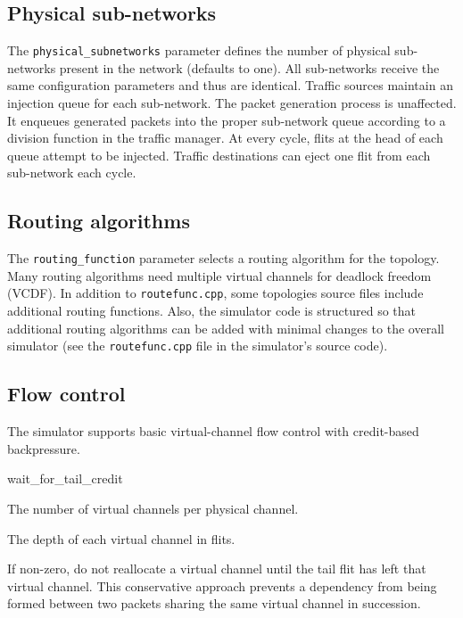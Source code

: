 \documentclass[11pt]{article}
\begin{document}
\subsection{Physical sub-networks}
\label{sec:physical_subnets}

The \texttt{physical\_subnetworks} parameter defines the number of physical sub-networks present in the network (defaults to one).
All sub-networks receive the same configuration parameters and thus are identical. Traffic sources
maintain an injection queue for each sub-network. The packet generation process is unaffected. It enqueues generated packets into the
proper sub-network queue according to a division function in the traffic manager. At every cycle, flits at the head of each queue attempt to be injected.
Traffic destinations can eject one flit from each sub-network each cycle.


\subsection{Routing algorithms}
\label{sec:routing_algs}

The \texttt{routing\_function} parameter selects a routing algorithm
for the topology.  Many routing algorithms need multiple virtual
channels for deadlock freedom (VCDF). In addition to \texttt{routefunc.cpp}, some topologies source files include additional routing functions. Also, the simulator code is structured so that additional routing algorithms can be added with minimal changes to the overall simulator (see the \texttt{routefunc.cpp} file in the simulator's source code).

\subsection{Flow control}

The simulator supports basic virtual-channel flow control with
credit-based backpressure.  

\begin{opt_list}{wait\_for\_tail\_credit}

\item[num\_vcs] The number of virtual channels per physical channel.

\item[vc\_buf\_size] The depth of each virtual channel in flits.


  
\item[wait\_for\_tail\_credit] If non-zero, do not reallocate a virtual
channel until the tail flit has left that virtual channel.  This
conservative approach prevents a dependency from being formed between
two packets sharing the same virtual channel in succession.
\end{opt_list}
\end{document}
